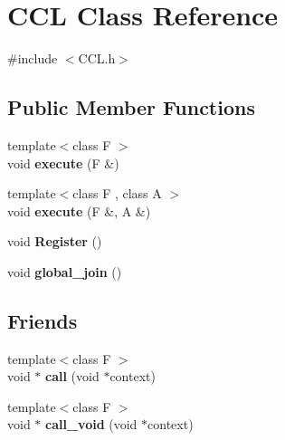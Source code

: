 \hypertarget{classCCL}{\section{C\-C\-L Class Reference}
\label{classCCL}
}


{\ttfamily \#include $<$C\-C\-L.\-h$>$}

\subsection*{Public Member Functions}
\begin{DoxyCompactItemize}
\item 
\hypertarget{classCCL_a209f0de55a2fcab9ba1d1c9164d7c35c}{{\footnotesize template$<$class F $>$ }\\void {\bfseries execute} (F \&)}\label{classCCL_a209f0de55a2fcab9ba1d1c9164d7c35c}

\item 
\hypertarget{classCCL_ad6742db95a4a3fceb109aee7dde5f11e}{{\footnotesize template$<$class F , class A $>$ }\\void {\bfseries execute} (F \&, A \&)}\label{classCCL_ad6742db95a4a3fceb109aee7dde5f11e}

\item 
\hypertarget{classCCL_aa3b44925cc03e27b541d37ba976042a4}{void {\bfseries Register} ()}\label{classCCL_aa3b44925cc03e27b541d37ba976042a4}

\item 
\hypertarget{classCCL_a45e1b489dbdc5cf28f12c8191257cd44}{void {\bfseries global\-\_\-join} ()}\label{classCCL_a45e1b489dbdc5cf28f12c8191257cd44}

\end{DoxyCompactItemize}
\subsection*{Friends}
\begin{DoxyCompactItemize}
\item 
\hypertarget{classCCL_ac3004890fd4cc619d129d1bc8edafc03}{{\footnotesize template$<$class F $>$ }\\void $\ast$ {\bfseries call} (void $\ast$context)}\label{classCCL_ac3004890fd4cc619d129d1bc8edafc03}

\item 
\hypertarget{classCCL_aaf865c547fc5aea630deaa9a24c9e683}{{\footnotesize template$<$class F $>$ }\\void $\ast$ {\bfseries call\-\_\-void} (void $\ast$context)}\label{classCCL_aaf865c547fc5aea630deaa9a24c9e683}

\end{DoxyCompactItemize}



